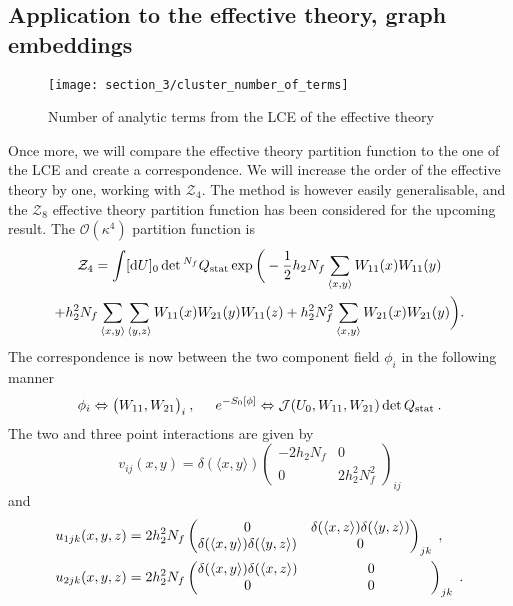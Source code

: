 \subsection{Application to the effective theory, graph embeddings}

\begin{figure}[t]
  {\centering
    \texttt{[image: section\_3/cluster\_number\_of\_terms]}\par}
  \caption{Number of analytic terms from the LCE of the effective theory}
  \label{fig:cluster_num_terms}
\end{figure}

Once more, we will compare the effective theory partition function to the one of
the LCE and create a correspondence. We will increase the order of the effective
theory by one, working with $\mathcal{Z}_4$. The method is however easily
generalisable, and the $\mathcal{Z}_8$ effective theory partition function has
been considered for the upcoming result. The $\mathcal{O}(\kappa^4)$ partition
function is
%
\begin{multline}
  \mathcal{Z}_4 = \int [ \mathrm{d} U ]_0 \det{}^{N_f} Q_{\text{stat}} \exp \bigg(-\frac{1}{2}
    h_2 N_f \sum_{\langle x,y \rangle} W_{11} (x) W_{11} (y)\\
  + h_2^2 N_f \sum_{\langle x,y \rangle} \sum_{\langle y,z \rangle} W_{11}(x)
    W_{21}(y) W_{11}(z)
  + h_2^2 N_f^2 \sum_{\langle x,y \rangle} W_{21}(x) W_{21}(y) \bigg).
\end{multline}
%
The correspondence is now between the two component field $\phi_i$ in the
following manner
%
\begin{equation}
  \phi_i \Leftrightarrow \big(W_{11}, W_{21}\big)_i\:, \hskip .5cm
  e^{-S_0[\phi]} \Leftrightarrow \mathcal{J} (U_0, W_{11}, W_{21}) \det Q_{\text{stat}}
  \:.
\end{equation}
%
The two and three point interactions are given by
%
\begin{equation}
  v_{ij}(x,y) = \delta(\langle x,y \rangle)
    \begin{pmatrix}
      -2 h_2 N_f & 0 \\
      0 & 2 h_2^2 N_f^2
    \end{pmatrix}_{ij}
\end{equation}
%
and
%
\begin{align}
  u_{1jk}(x,y,z) &= 2 h_2^2 N_f 
    \begin{pmatrix}
      0 & \delta(\langle x,z \rangle) \delta(\langle y,z \rangle) \\
      \delta(\langle x,y \rangle) \delta(\langle y,z \rangle) & 0
    \end{pmatrix}_{jk} \;,\\
  u_{2jk}(x,y,z) &= 2 h_2^2 N_f  
  \begin{pmatrix}
    \delta(\langle x,y \rangle) \delta(\langle x,z \rangle) & 0 \\
    0 & \makebox[3cm][c]{$0$}
  \end{pmatrix}_{jk}\;.
\end{align}
